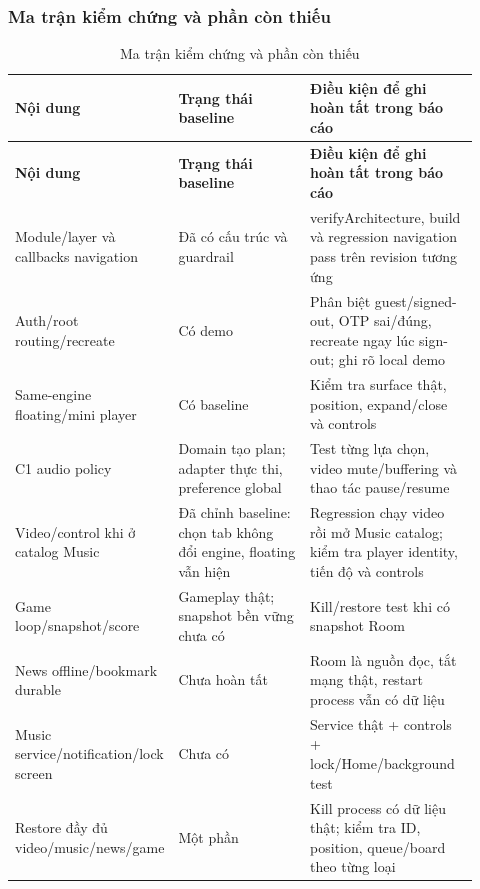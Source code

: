 \subsubsection{Ma trận kiểm chứng và phần còn thiếu}
\label{sec:arch-test-cases}

\begingroup
\small
\renewcommand{\arraystretch}{1.2}
\setlength{\tabcolsep}{3pt}
\begin{longtable}{>{\RaggedRight\arraybackslash}p{0.23\linewidth}>{\RaggedRight\arraybackslash}p{0.32\linewidth}>{\RaggedRight\arraybackslash}p{0.37\linewidth}}
\caption{Ma trận kiểm chứng và phần còn thiếu}
\label{tab:arch-test-cases}\\
\toprule
\textbf{Nội dung} & \textbf{Trạng thái baseline} & \textbf{Điều kiện để ghi hoàn tất trong báo cáo} \\
\midrule
\endfirsthead
\toprule
\textbf{Nội dung} & \textbf{Trạng thái baseline} & \textbf{Điều kiện để ghi hoàn tất trong báo cáo} \\
\midrule
\endhead
\bottomrule
\endfoot
Module/layer và callbacks navigation & Đã có cấu trúc và guardrail & verifyArchitecture, build và regression navigation pass trên revision tương ứng \\
Auth/root routing/recreate & Có demo & Phân biệt guest/signed-out, OTP sai/đúng, recreate ngay lúc sign-out; ghi rõ local demo \\
Same-engine floating/mini player & Có baseline & Kiểm tra surface thật, position, expand/close và controls \\
C1 audio policy & Domain tạo plan; adapter thực thi, preference global & Test từng lựa chọn, video mute/buffering và thao tác pause/resume \\
Video/control khi ở catalog Music & Đã chỉnh baseline: chọn tab không đổi engine, floating vẫn hiện & Regression chạy video rồi mở Music catalog; kiểm tra player identity, tiến độ và controls \\
Game loop/snapshot/score & Gameplay thật; snapshot bền vững chưa có & Kill/restore test khi có snapshot Room \\
News offline/bookmark durable & Chưa hoàn tất & Room là nguồn đọc, tắt mạng thật, restart process vẫn có dữ liệu \\
Music service/notification/lock screen & Chưa có & Service thật + controls + lock/Home/background test \\
Restore đầy đủ video/music/news/game & Một phần & Kill process có dữ liệu thật; kiểm tra ID, position, queue/board theo từng loại \\

\end{longtable}
